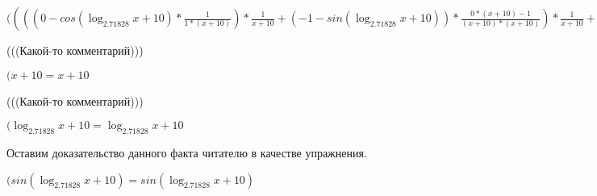 \documentclass[12pt,a4paper,fleqn]{article}
\theoremstyle{definition}
\begin{document}
$(((( 0  - cos(\log_{ 2.71828 }{ x  +  10 }) * \frac{ 1 }{ 1  * ( x  +  10 )}
) * \frac{ 1 }{ x  +  10 }
 + ( -1  - sin(\log_{ 2.71828 }{ x  +  10 })) * \frac{ 0  * ( x  +  10 ) -  1 }{( x  +  10 ) * ( x  +  10 )}
) * \frac{ 1 }{ x  +  10 }
 + ( -1  - sin(\log_{ 2.71828 }{ x  +  10 })) * \frac{ 1 }{ x  +  10 }
 * \frac{ 0  * ( x  +  10 ) -  1 }{( x  +  10 ) * ( x  +  10 )}
 + ( -1  - sin(\log_{ 2.71828 }{ x  +  10 })) * \frac{ 1 }{ 1  * ( x  +  10 )}
 * \frac{ -2 }{( x  +  10 ) * ( x  +  10 )}
 + cos(\log_{ 2.71828 }{ x  +  10 }) * \frac{ 0  * ( x  +  10 ) * ( x  +  10 ) -  -2  * ( 1  * ( x  +  10 ) + ( x  +  10 ) *  1 )}{( x  +  10 ) * ( x  +  10 ) * ( x  +  10 ) * ( x  +  10 )}
) * { 3 }^{sin(\log_{ 2.71828 }{ x  +  10 })} + (( -1  - sin(\log_{ 2.71828 }{ x  +  10 })) * \frac{ 1 }{ x  +  10 }
 * \frac{ 1 }{ x  +  10 }
 + cos(\log_{ 2.71828 }{ x  +  10 }) * \frac{ -2 }{( x  +  10 ) * ( x  +  10 )}
) *  1  * cos(\log_{ 2.71828 }{ x  +  10 }) * \frac{ 1 }{ 1  * ( x  +  10 )}
 * { 3 }^{sin(\log_{ 2.71828 }{ x  +  10 })} = ((( 0  - cos(\log_{ 2.71828 }{ x  +  10 }) * \frac{ 1 }{ 1  * ( x  +  10 )}
) * \frac{ 1 }{ x  +  10 }
 + ( -1  - sin(\log_{ 2.71828 }{ x  +  10 })) * \frac{ 0  * ( x  +  10 ) -  1 }{( x  +  10 ) * ( x  +  10 )}
) * \frac{ 1 }{ x  +  10 }
 + ( -1  - sin(\log_{ 2.71828 }{ x  +  10 })) * \frac{ 1 }{ x  +  10 }
 * \frac{ 0  * ( x  +  10 ) -  1 }{( x  +  10 ) * ( x  +  10 )}
 + ( -1  - sin(\log_{ 2.71828 }{ x  +  10 })) * \frac{ 1 }{ 1  * ( x  +  10 )}
 * \frac{ -2 }{( x  +  10 ) * ( x  +  10 )}
 + cos(\log_{ 2.71828 }{ x  +  10 }) * \frac{ 0  * ( x  +  10 ) * ( x  +  10 ) -  -2  * ( 1  * ( x  +  10 ) + ( x  +  10 ) *  1 )}{( x  +  10 ) * ( x  +  10 ) * ( x  +  10 ) * ( x  +  10 )}
) * { 3 }^{sin(\log_{ 2.71828 }{ x  +  10 })} + (( -1  - sin(\log_{ 2.71828 }{ x  +  10 })) * \frac{ 1 }{ x  +  10 }
 * \frac{ 1 }{ x  +  10 }
 + cos(\log_{ 2.71828 }{ x  +  10 }) * \frac{ -2 }{( x  +  10 ) * ( x  +  10 )}
) *  1  * cos(\log_{ 2.71828 }{ x  +  10 }) * \frac{ 1 }{ 1  * ( x  +  10 )}
 * { 3 }^{sin(\log_{ 2.71828 }{ x  +  10 })}$

(((Какой-то комментарий)))

$( x  +  10  =  x  +  10 $

(((Какой-то комментарий)))

$(\log_{ 2.71828 }{ x  +  10 } = \log_{ 2.71828 }{ x  +  10 }$

Оставим доказательство данного факта читателю в качестве упражнения.

$(sin(\log_{ 2.71828 }{ x  +  10 }) = sin(\log_{ 2.71828 }{ x  +  10 })$
\end{document}
